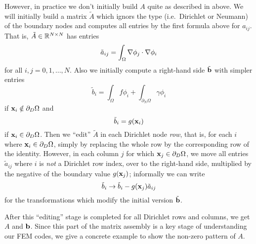 However, in practice we don't initially build $A$ quite as described in above.  We will initially build a matrix $\tilde A$ which ignors the type (i.e.~Dirichlet or Neumann) of the boundary nodes and computes all entries by the first formula above for $a_{ij}$.  That is, $\tilde A \in \mathbb{R}^{N\times N}$ has entries
\begin{equation*}
\tilde a_{ij} = \int_\Omega \nabla \phi_j \cdot \nabla \phi_i
\end{equation*}
for all $i,j=0,1,\dots,N$.  Also we initially compute a right-hand side $\tilde {\mathbf{b}}$ with simpler entries
    $$\tilde b_i = \int_\Omega f \phi_i + \int_{\partial_N\Omega} \gamma \phi_i$$
if $\mathbf{x}_i \notin \partial_D \Omega$ and
    $$\tilde b_i = g(\mathbf{x}_{i})$$
if $\mathbf{x}_i \in \partial_D \Omega$.  Then we ``edit'' $\tilde A$ in each Dirichlet node \emph{row}, that is, for each $i$ where $\mathbf{x}_i \in \partial_D \Omega$, simply by replacing the whole row by the corresponding row of the identity.  However, in each column $j$ for which $\mathbf{x}_j \in \partial_D \Omega$, we move all entries $\tilde a_{ij}$ where $i$ is \emph{not} a Dirichlet row index, over to the right-hand side, multiplied by the negative of the boundary value $g(\mathbf{x}_{j})$; informally we can write
    $$\tilde b_i \to \tilde b_i - g(\mathbf{x}_{j}) \tilde a_{ij}$$
for the transformations which modify the initial version $\tilde {\mathbf{b}}$.

After this ``editing'' stage is completed for all Dirichlet rows and columns, we get $A$ and $\mathbf{b}$.  Since this part of the matrix assembly is a key stage of understanding our FEM codes, we give a concrete example to show the non-zero pattern of $A$.

\newcommand{\redX}{{\color{red} \X}}
\newcommand{\blueX}{{\color{blue} \X}}

